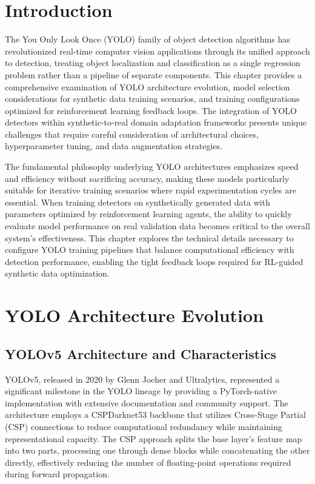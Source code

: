 

\section{Introduction}

The You Only Look Once (YOLO) family of object detection algorithms has revolutionized real-time computer vision applications through its unified approach to detection, treating object localization and classification as a single regression problem rather than a pipeline of separate components. This chapter provides a comprehensive examination of YOLO architecture evolution, model selection considerations for synthetic data training scenarios, and training configurations optimized for reinforcement learning feedback loops. The integration of YOLO detectors within synthetic-to-real domain adaptation frameworks presents unique challenges that require careful consideration of architectural choices, hyperparameter tuning, and data augmentation strategies.

The fundamental philosophy underlying YOLO architectures emphasizes speed and efficiency without sacrificing accuracy, making these models particularly suitable for iterative training scenarios where rapid experimentation cycles are essential. When training detectors on synthetically generated data with parameters optimized by reinforcement learning agents, the ability to quickly evaluate model performance on real validation data becomes critical to the overall system's effectiveness. This chapter explores the technical details necessary to configure YOLO training pipelines that balance computational efficiency with detection performance, enabling the tight feedback loops required for RL-guided synthetic data optimization.

\section{YOLO Architecture Evolution}
\label{sec:yolo_evolution}

\subsection{YOLOv5 Architecture and Characteristics}

YOLOv5, released in 2020 by Glenn Jocher and Ultralytics, represented a significant milestone in the YOLO lineage by providing a PyTorch-native implementation with extensive documentation and community support. The architecture employs a CSPDarknet53 backbone that utilizes Cross-Stage Partial (CSP) connections to reduce computational redundancy while maintaining representational capacity. The CSP approach splits the base layer's feature map into two parts, processing one through dense blocks while concatenating the other directly, effectively reducing the number of floating-point operations required during forward propagation.

